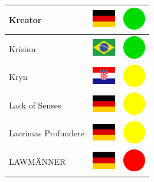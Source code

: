 \documentclass[12pt, a4paper, twoside]{report}
\begin{document}
\begin{center}
\begin{longtable}{|p{5cm}|p{2cm}|p{2cm}|}
 Kreator                                                    & \includegraphics[width=1cm]{4x3/de} &   \includegraphics[width=1cm]{likes/y} \\ \hline
 Krisiun                                                    & \includegraphics[width=1cm]{4x3/br} &   \includegraphics[width=1cm]{likes/y} \\ \hline
 Kryn                                                       & \includegraphics[width=1cm]{4x3/hr} &   \includegraphics[width=1cm]{likes/m} \\ \hline
 Lack of Senses                                             & \includegraphics[width=1cm]{4x3/de} &   \includegraphics[width=1cm]{likes/m} \\ \hline
 Lacrimas Profundere                                        & \includegraphics[width=1cm]{4x3/de} &   \includegraphics[width=1cm]{likes/m} \\ \hline
 LAWMÄNNER                                                  & \includegraphics[width=1cm]{4x3/de} &   \includegraphics[width=1cm]{likes/n} \\ \hline

\end{longtable}
\end{center}
\end{document}
